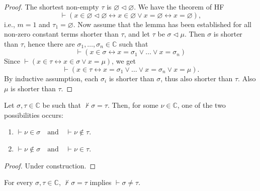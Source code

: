 \begin{proof}
    \leanok
    The shortest non-empty $\tau$ is $\varnothing \lhd \varnothing$. 
    We have the theorem of HF
    $$
    \vdash (x \in \varnothing \lhd \varnothing \leftrightarrow x \in \varnothing \lor x=\varnothing
    \leftrightarrow x=\varnothing),
    $$
    i.e., $m=1$ and $\tau_1 = \varnothing$. 
    Now assume that the lemma has been established for all non-zero constant terms shorter 
    than $\tau$, and let $\tau$ be $\sigma \lhd \mu$. 
    Then $\sigma$ is shorter than $\tau$, 
    hence there are $\sigma_1, \ldots, \sigma_n \in \mathbb{C}$ such that
    $$
    \vdash (x \in \sigma \leftrightarrow x=\sigma_1 \lor \ldots \lor x=\sigma_n)
    $$
    Since $\vdash (x \in \tau \leftrightarrow x \in \sigma \lor x=\mu)$, we get
    $$
    \vdash (x \in \tau \leftrightarrow x=\sigma_1 \lor \ldots \lor x=\sigma_n \lor x=\mu).
    $$
    By inductive assumption, 
    each $\sigma_i$ is shorter than $\sigma$, thus also shorter than $\tau$. 
    Also $\mu$ is shorter than $\tau$.
\end{proof}

\begin{lemma}
    \label{lem:C.exists_mem_and_notin_of_not_eq}
    \leanok
    Let $\sigma, \tau \in \mathbb{C}$ be such that $\not\vdash \sigma = \tau$. 
    Then, for some $\nu \in \mathbb{C}$, one of the two possibilities occurs:
    \begin{enumerate}
        \item $\vdash \nu \in \sigma \quad \text{and} \quad \vdash \nu \notin \tau$.
        \item $\vdash \nu \notin \sigma \quad \text{and} \quad \vdash \nu \in \tau$.
    \end{enumerate}
\end{lemma}

\begin{proof}
    Under construction.
\end{proof}

\begin{corollary}
    \label{cor:C.ne_of_not_eq}
    \leanok
    For every $\sigma, \tau \in \mathbb{C}$, $\not\vdash \sigma = \tau$ implies 
    $\vdash \sigma \neq \tau$.
\end{corollary}

